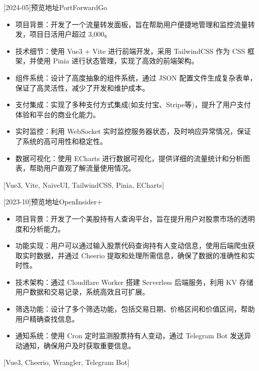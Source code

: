 \documentclass[zh]{resume}
\begin{document}
\begin{projects}
  [2024-05]{预览地址}{}{PortForwardGo}{
    \begin{itemize}
      \item 项目背景：开发了一个流量转发面板，旨在帮助用户便捷地管理和监控流量转发，项目日活用户超过 3,000。
      \item 技术细节：使用 Vue3 + Vite 进行前端开发，采用 TailwindCSS 作为 CSS 框架，并使用 Pinia 进行状态管理，实现了高效的前端架构。
      \item 组件系统：设计了高度抽象的组件系统，通过 JSON 配置文件生成复杂表单，保证了高灵活性，减少了开发和维护成本。
      \item 支付集成：实现了多种支付方式集成(如支付宝、Stripe等)，提升了用户支付体验和平台的商业化能力。
      \item 实时监控：利用 WebSocket 实时监控服务器状态，及时响应异常情况，保证了系统的高可用性和稳定性。
      \item 数据可视化：使用 ECharts 进行数据可视化，提供详细的流量统计和分析图表，帮助用户直观了解流量使用情况。
    \end{itemize}
  }[Vue3, Vite, NaiveUI, TailwindCSS, Pinia, ECharts]

  \separator{0.5ex}
  [2023-10]{预览地址}{}{OpenInsider+}{
    \begin{itemize}
      \item 项目背景：开发了一个美股持有人查询平台，旨在提升用户对股票市场的透明度和分析能力。
      \item 功能实现：用户可以通过输入股票代码查询持有人变动信息，使用后端爬虫获取实时数据，并通过 Cheerio 提取和处理所需信息，确保了数据的准确性和实时性。
      \item 技术架构：通过 Cloudflare Worker 搭建 Serverless 后端服务，利用 KV 存储用户数据和交易记录，系统高效且可扩展。
      \item 筛选功能：设计了多个筛选功能，包括交易日期、价格区间和价值区间，帮助用户精确查找信息。
      \item 通知系统：使用 Cron 定时监测股票持有人变动，通过 Telegram Bot 发送异动通知，确保用户及时获取重要信息。
    \end{itemize}
  }[Vue3, Cheerio, Wrangler, Telegram Bot]


\end{projects}
\end{document}
